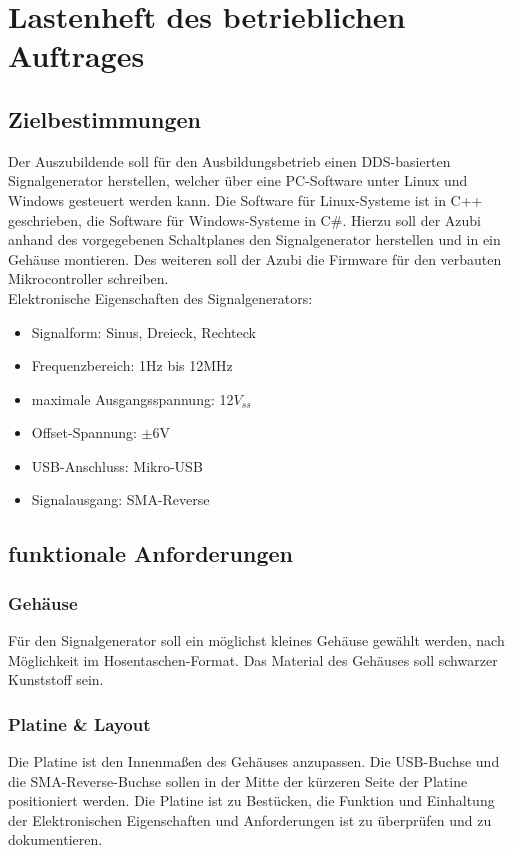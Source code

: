 \section[Lastenheft betriebl. Auftrag]{Lastenheft des betrieblichen Auftrages}

\subsection{Zielbestimmungen}
Der Auszubildende soll für den Ausbildungsbetrieb einen DDS-basierten Signalgenerator herstellen, welcher über eine PC-Software unter Linux und Windows gesteuert werden kann. Die Software für Linux-Systeme ist in C++ geschrieben, die Software für Windows-Systeme in C\#. Hierzu soll der Azubi anhand des vorgegebenen Schaltplanes den Signalgenerator herstellen und in ein Gehäuse montieren. Des weiteren soll der Azubi die Firmware für den verbauten Mikrocontroller schreiben.\\
Elektronische Eigenschaften des Signalgenerators:
\begin{itemize}
\item Signalform: Sinus, Dreieck, Rechteck
\item Frequenzbereich: 1Hz bis 12MHz
\item maximale Ausgangsspannung: 12$V_{ss}$
\item Offset-Spannung: $\pm$6V
\item USB-Anschluss: Mikro-USB
\item Signalausgang: SMA-Reverse
\end{itemize}

\subsection{funktionale Anforderungen}
\subsubsection{Gehäuse}
Für den Signalgenerator soll ein möglichst kleines Gehäuse gewählt werden, nach Möglichkeit im \glqq Hosentaschen-Format\grqq . Das Material des Gehäuses soll schwarzer Kunststoff sein.
\subsubsection{Platine \& Layout}
Die Platine ist den Innenmaßen des Gehäuses anzupassen. Die USB-Buchse und die SMA-Reverse-Buchse sollen in der Mitte der kürzeren Seite der Platine positioniert werden. Die Platine ist zu Bestücken, die Funktion und Einhaltung der Elektronischen Eigenschaften und Anforderungen ist zu überprüfen und zu dokumentieren.

